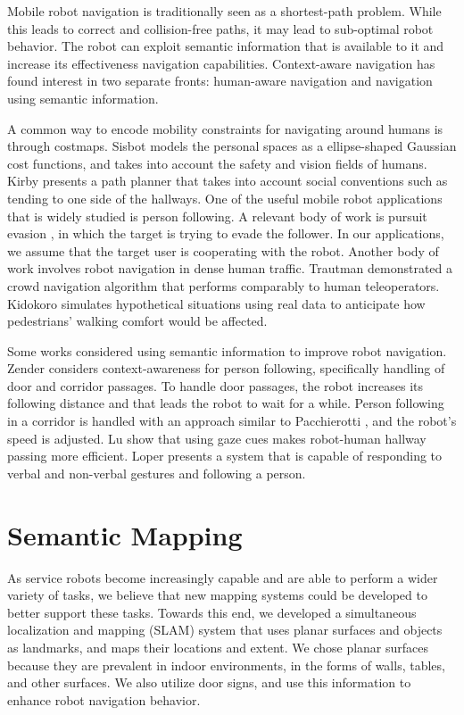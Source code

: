 \documentclass[3p]{elsarticle}
\begin{document}
Mobile robot navigation is traditionally seen as a shortest-path problem. 
While this leads to correct and collision-free paths, it may lead to sub-optimal robot behavior.
The robot can exploit semantic information that is available to it and increase its effectiveness
navigation capabilities. Context-aware navigation has found interest in two separate fronts: 
human-aware navigation and navigation using semantic information.

A common way to encode mobility constraints for navigating around humans is through costmaps. Sisbot \cite{sisbot2007human} models the
personal spaces as a ellipse-shaped Gaussian cost functions, and takes into account
the safety and vision fields of humans. Kirby \cite{kirby2009companion} presents a path planner that takes
into account social conventions such as tending to one side of the hallways. One of the useful mobile robot applications that is widely studied is person following.
A relevant body of work is pursuit evasion \cite{chung2011search}, in which the target is trying to evade the follower. In
our applications, we assume that the target user is cooperating with the robot. Another body of work involves robot navigation in dense human traffic. Trautman \cite{trautman2015robot} demonstrated a crowd navigation algorithm that performs comparably to human teleoperators. Kidokoro \cite{kidokoro2015simulation} simulates hypothetical situations using real data to anticipate how pedestrians' walking comfort would be affected.
 
Some works considered using semantic information to improve robot navigation. Zender \cite{zender2007human} considers context-awareness for person following, specifically handling of door and corridor passages. To
handle door passages, the robot increases its following distance and that leads the robot
to wait for a while. Person following in a corridor is handled with an approach similar to
Pacchierotti \cite{pacchierotti2005human}, and the robot’s speed is adjusted. Lu \cite{lu2013towards} show that using gaze cues makes 
robot-human hallway passing more efficient. Loper \cite{loper2009mobile} presents a system that
is capable of responding to verbal and non-verbal gestures and following a person. 

\section{Semantic Mapping}
\label{sec:slam_and_semantic_mapping}

As service robots become increasingly capable and are able to perform a wider
variety of tasks, we believe that new mapping systems could be developed to better
support these tasks. Towards this end, we developed a simultaneous localization
and mapping (SLAM) system that uses planar surfaces and objects as landmarks, and maps their locations and extent. We chose planar surfaces because they are prevalent in indoor environments, in the forms of walls, tables, and other surfaces.   We also utilize door signs, and use this information to enhance robot navigation behavior.
\end{document}
